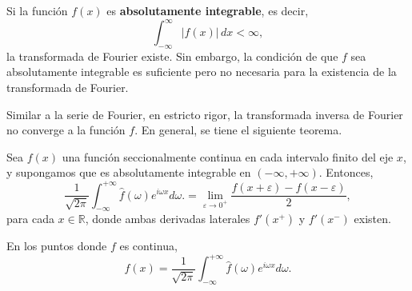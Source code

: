 Si la función $f(x)$ es \textbf{absolutamente integrable}, es decir,
\begin{equation}
    \int_{-\infty}^{\infty} |f(x)| \,dx < \infty,
\end{equation}
la transformada de Fourier existe. Sin embargo, la condición de que $f$ sea absolutamente integrable es suficiente pero no necesaria para la existencia de la transformada de Fourier. 

Similar a la serie de Fourier, en estricto rigor, la transformada inversa de Fourier no converge a la función $f$. En general, se tiene el siguiente teorema.

\begin{teorema} 
Sea $f(x)$ una función seccionalmente continua en cada intervalo finito del eje $x$, y  supongamos que es absolutamente integrable en $(-\infty, + \infty)$. Entonces,
\begin{equation}
    \frac{1}{\sqrt{2\pi}} \int_{-\infty}^{+\infty} \hat{f}(\omega) e^{i\omega x} d\omega. = \lim_{\varepsilon \to 0^{+}} \frac{f(x + \varepsilon) - f(x - \varepsilon)}{2},
\end{equation}
\vspace{-0.05cm}
para cada $x \in \mathbb{R}$, donde ambas derivadas laterales $f'(x^+)$ y $f'(x^-)$ existen.
\end{teorema}

En los puntos donde $f$ es continua,
\begin{equation}
    f(x) = \frac{1}{\sqrt{2\pi}} \int_{-\infty}^{+\infty} \hat{f}(\omega) e^{i\omega x} d\omega.
\end{equation}

